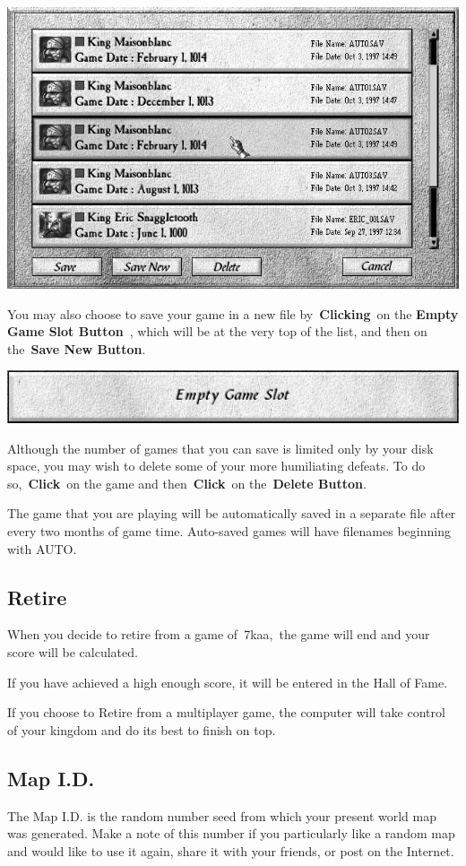 \begin{center}
	\includegraphics[width=0.7\linewidth]{Isavegame}
\end{center}

You may also choose to save your game in a new file by \textbf{Clicking} on the \textbf{Empty Game Slot Button} , which will be at the very top of the list, and then on the \textbf{Save New Button}.

\begin{center}
	\includegraphics[width=0.7\linewidth]{Isavegame_emptyslot}
\end{center}

Although the number of games that you can save is limited only by your disk space, you may wish to delete some of your more humiliating defeats. To do so, \textbf{Click} on the game and then \textbf{Click} on the \textbf{Delete Button}.

The game that you are playing will be automatically saved in a separate file after every two months of game time. Auto-saved games will have filenames beginning with AUTO.

\subsection{Retire}

When you decide to retire from a game of 7kaa, the game will end and your score will be calculated.

If you have achieved a high enough score, it will be entered in the Hall of Fame.

If you choose to Retire from a multiplayer game, the computer will take control of your kingdom and do its best to finish on top.

\subsection{Map I.D.}

The Map I.D. is the random number seed from which your present world map was generated. Make a note of this number if you particularly like a random map and would like to use it again, share it with your friends, or post on the Internet.